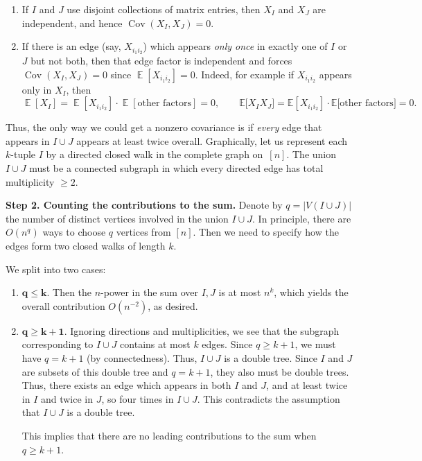 \documentclass[letterpaper,11pt,oneside,reqno]{article}
\numberwithin{equation}{section}
\theoremstyle{definition}
\begin{document}
\begin{enumerate}
\item
If \(I\) and \(J\) use disjoint collections of matrix entries, then \(X_I\) and \(X_J\) are independent, and hence $\operatorname{\mathrm{Cov}}(X_I,X_J)=0$.

\item
	If there is an edge (say, \(X_{i_1 i_2}\)) which appears
	\emph{only once}
	in exactly one of \(I\) or \(J\) but not both, then that
	edge factor is independent and forces
	$\operatorname{\mathrm{Cov}}(X_I,X_J)=0$ since
	$\operatorname{\mathbb{E}}[X_{i_1 i_2}]=0$.
Indeed, for example if \(X_{i_1 i_2}\) appears only in \(X_I\), then
\[
	\operatorname{\mathbb{E}}\left[ X_I \right]
	=
	\operatorname{\mathbb{E}}\left[ X_{i_1 i_2} \right]
	\cdot
	\operatorname{\mathbb{E}}\left[ \text{other factors} \right]
	=0,
	\qquad
	\mathbb{E}\bigl[X_I X_J\bigr]
	=
	\mathbb{E}[X_{i_1 i_2}]
	\cdot
	\mathbb{E}\bigl[\text{other factors}\bigr]
	=0.
\]

\end{enumerate}

\noindent
Thus, the only way we could get a nonzero covariance is if \emph{every} edge that appears in \(I\cup J\) appears at least twice overall.
Graphically, let us represent each \(k\)-tuple \(I\) by a directed closed walk in the complete graph on~\([n]\).  The union \(I\cup J\) must be a connected subgraph in which every directed edge has total multiplicity \(\ge2\).

\medskip

\noindent
\textbf{Step 2. Counting the contributions to the sum.}
Denote by \(q=\lvert V(I\cup J)\rvert\) the number of
distinct vertices involved in the union \(I\cup J\).
In principle, there are $O(n^q)$ ways to choose $q$ vertices from $[n]$.
Then we need to specify how the edges form two closed walks of length $k$.

We split into two cases:
\begin{enumerate}
\item
\(\boldsymbol{q\le k.}\)
Then the $n$-power in the sum over $I,J$ is at most
$n^k$, which yields the overall contribution
$O(n^{-2})$, as desired.

\item
\(\boldsymbol{q\ge k+1.}\)
Ignoring directions and multiplicities,
we see that the subgraph corresponding to $I\cup J$
contains at most \(k\) edges. Since \(q \ge k + 1\), we must have \(q = k + 1\)
(by connectedness). Thus,
\(I \cup J\) is a double tree.
Since $I$ and $J$ are subsets of this double tree and $q=k+1$,
they also must be double trees.
Thus, there exists an edge which appears in both $I$ and $J$, and
at least twice in $I$ and twice in $J$, so four times in $I\cup J$.
This contradicts the assumption that $I\cup J$ is a double tree.

This implies that
there are no leading contributions to the sum when \(q\ge k+1\).
\end{enumerate}
\end{document}
